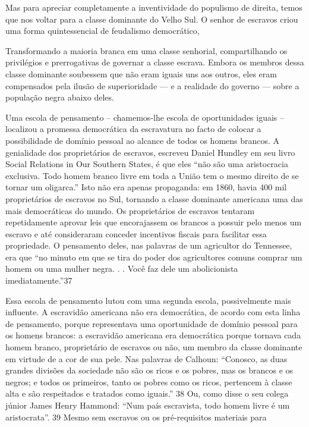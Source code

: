  \par 
Mas para apreciar completamente a inventividade do populismo de direita, temos que nos voltar para a classe dominante do Velho Sul. O senhor de escravos criou uma forma quintessencial de feudalismo democrático,
 \par 
Transformando a maioria branca em uma classe senhorial, compartilhando os privilégios e prerrogativas de governar a classe escrava. Embora os membros dessa classe dominante soubessem que não eram iguais uns aos outros, eles eram compensados ​​pela ilusão de superioridade — e a realidade do governo — sobre a população negra abaixo deles.
 \par 
Uma escola de pensamento – chamemos-lhe escola de oportunidades iguais – localizou a promessa democrática da escravatura no facto de colocar a possibilidade de domínio pessoal ao alcance de todos os homens brancos. A genialidade dos proprietários de escravos, escreveu Daniel Hundley em seu livro Social Relations in Our Southern States, é que eles “não são uma aristocracia exclusiva. Todo homem branco livre em toda a União tem o mesmo direito de se tornar um oligarca.” Isto não era apenas propaganda: em 1860, havia {\color{blue}400} mil proprietários de escravos no Sul, tornando a classe dominante americana uma das mais democráticas do mundo. Os proprietários de escravos tentaram repetidamente aprovar leis que encorajassem os brancos a possuir pelo menos um escravo e até consideraram conceder incentivos fiscais para facilitar essa propriedade. O pensamento deles, nas palavras de um agricultor do Tennessee, era que “no minuto em que se tira do poder dos agricultores comuns comprar um homem ou uma mulher negra. . . Você faz dele um abolicionista imediatamente.”{\color{blue}37}
 \par 
Essa escola de pensamento lutou com uma segunda escola, possivelmente mais influente. A escravidão americana não era democrática, de acordo com esta linha de pensamento, porque representava uma oportunidade de domínio pessoal para os homens brancos: a escravidão americana era democrática porque tornava cada homem branco, proprietário de escravos ou não, um membro da classe dominante em virtude de a cor de sua pele. Nas palavras de Calhoun: “Conosco, as duas grandes divisões da sociedade não são os ricos e os pobres, mas os brancos e os negros; e todos os primeiros, tanto os pobres como os ricos, pertencem à classe alta e são respeitados e tratados como iguais.” {\color{blue}38} Ou, como disse o seu colega júnior James Henry Hammond: “Num país escravista, todo homem livre é um aristocrata”. {\color{blue}39} Mesmo sem escravos ou os pré-requisitos materiais para
